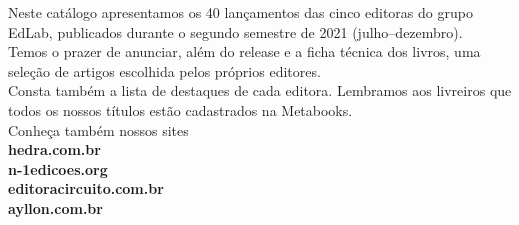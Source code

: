 \hspace*{-.5cm}\parbox{180pt}{\raggedright 
Neste catálogo apresentamos os 40 lançamentos das cinco editoras do grupo EdLab, publicados durante o segundo semestre de 2021 (julho--dezembro).\\
\smallskip
Temos o prazer de anunciar, além do release e a ficha técnica dos livros, uma seleção de artigos escolhida pelos próprios editores.\\
\smallskip
Consta também a lista de destaques de cada editora. Lembramos aos livreiros que todos os nossos títulos estão cadastrados na Metabooks.\\
\bigskip
Conheça também nossos sites\\
\textbf{hedra.com.br}\\
\textbf{n-1edicoes.org}\\
\textbf{editoracircuito.com.br}\\
\textbf{ayllon.com.br}
}

\pagebreak

